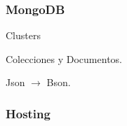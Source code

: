 \documentclass{beamer}
\begin{document}
\begin{frame}
    \frametitle{MongoDB}
    \large
    Clusters\break \pause
    \vfill

    Colecciones y Documentos.\break \pause
    \vfill

    Json $\rightarrow$ Bson.
\end{frame}



\begin{frame}
    \frametitle{Hosting}
    \begin{table}
    \end{table}
\end{frame}
\end{document}
